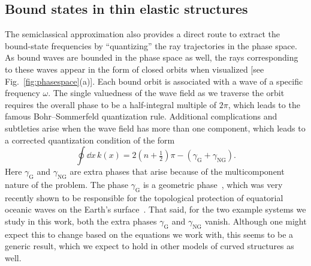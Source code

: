 \subsection{Bound states in thin elastic structures}

The semiclassical approximation also provides a direct route to extract the bound-state frequencies by ``quantizing'' the ray trajectories in the phase space.
As bound waves are bounded in the phase space as well, the rays corresponding to these waves appear in the form of closed orbits when visualized [see Fig.~\ref{fig:phasespace}(a)].
Each bound orbit is associated with a wave of a specific frequency $\omega$.
The single valuedness of the wave field as we traverse the orbit requires the overall phase to be a half-integral multiple of $2\pi$, which leads to the famous Bohr--Sommerfeld quantization rule.
Additional complications and subtleties arise when the wave field has more than one component, which leads to a corrected quantization condition of the form
%
\begin{equation}
  \oint \dd{x}\,k(x) = 2\left(n + \tfrac{1}{2}\right)\pi - \left(\gamma_{\text{G}} + \gamma_{\text{NG}}\right).
\end{equation}
%
Here $\gamma_{\text{G}}$ and $\gamma_{\text{NG}}$ are extra phases that arise because of the multicomponent nature of the problem.
The phase $\gamma_{\text{G}}$ is a geometric phase~\cite{pancharatnam1956,berry1984}, which was very recently shown to be responsible for the topological protection of equatorial oceanic waves on the Earth's surface~\cite{venaille2023}.
That said, for the two example systems we study in this work, both the extra phases $\gamma_{\text{G}}$ and $\gamma_{\text{NG}}$ vanish.
Although one might expect this to change based on the equations we work with, this seems to be a generic result, which we expect to hold in other models of curved structures as well.

